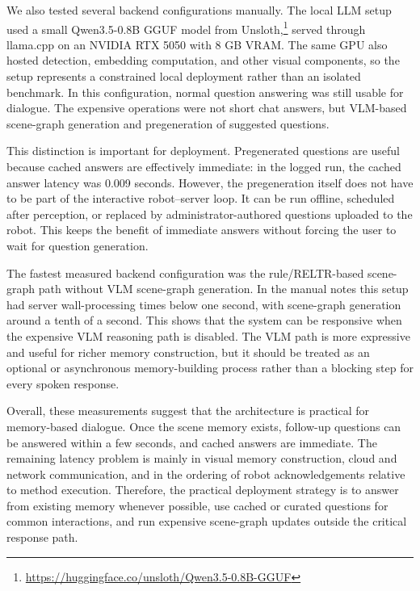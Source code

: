 We also tested several backend configurations manually. The local LLM setup used a small Qwen3.5-0.8B GGUF model from Unsloth,\footnote{\url{https://huggingface.co/unsloth/Qwen3.5-0.8B-GGUF}} served through llama.cpp on an NVIDIA RTX 5050 with 8 GB VRAM. The same GPU also hosted detection, embedding computation, and other visual components, so the setup represents a constrained local deployment rather than an isolated benchmark. In this configuration, normal question answering was still usable for dialogue. The expensive operations were not short chat answers, but VLM-based scene-graph generation and pregeneration of suggested questions.

This distinction is important for deployment. Pregenerated questions are useful because cached answers are effectively immediate: in the logged run, the cached answer latency was 0.009 seconds. However, the pregeneration itself does not have to be part of the interactive robot--server loop. It can be run offline, scheduled after perception, or replaced by administrator-authored questions uploaded to the robot. This keeps the benefit of immediate answers without forcing the user to wait for question generation.

The fastest measured backend configuration was the rule/RELTR-based scene-graph path without VLM scene-graph generation. In the manual notes this setup had server wall-processing times below one second, with scene-graph generation around a tenth of a second. This shows that the system can be responsive when the expensive VLM reasoning path is disabled. The VLM path is more expressive and useful for richer memory construction, but it should be treated as an optional or asynchronous memory-building process rather than a blocking step for every spoken response.

Overall, these measurements suggest that the architecture is practical for memory-based dialogue. Once the scene memory exists, follow-up questions can be answered within a few seconds, and cached answers are immediate. The remaining latency problem is mainly in visual memory construction, cloud and network communication, and in the ordering of robot acknowledgements relative to method execution. Therefore, the practical deployment strategy is to answer from existing memory whenever possible, use cached or curated questions for common interactions, and run expensive scene-graph updates outside the critical response path.

